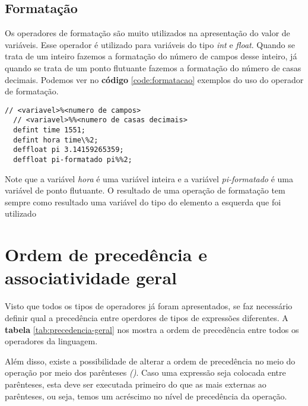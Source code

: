 \documentclass[
  12pt,				%
  oneside,			%
  a4paper,			%
  english,			%
  french,				%
  spanish,			%
  brazil,				%
]{abntex2}
\begin{document}
\subsection{Formatação}
\label{subsec:formatacao}
Os operadores de formatação são muito utilizados na apresentação do
valor de variáveis. Esse operador é utilizado para variáveis do tipo
\emph{int} e \emph{float}. Quando se trata de um inteiro fazemos a
formatação do número de campos desse inteiro, já quando se trata de um
ponto flutuante fazemos a formatação do número de casas
decimais. Podemos ver no \textbf{código} \ref{code:formatacao}
exemplos do uso do operador de formatação.

\begin{lstlisting}[label=code:formatacao,caption=Exemplo do uso do
  operador de formatação]
  // <variavel>%<numero de campos>
  // <variavel>%%<numero de casas decimais>
  defint time 1551;
  defint hora time\%2;
  deffloat pi 3.14159265359;
  deffloat pi-formatado pi%%2;
\end{lstlisting}

Note que a variável \emph{hora} é uma variável inteira e a variável
\emph{pi-formatado} é uma variável de ponto flutuante. O resultado de uma
operação de formatação tem sempre como resultado uma variável do tipo
do elemento a esquerda que foi utilizado



\section{Ordem de precedência e associatividade geral}
\label{sec:order-de-precedencia-e-associatividade-geral}

Visto que todos os tipos de operadores já foram apresentados, se faz
necessário definir qual a precedência entre operdores de tipos de
expressões diferentes. A \textbf{tabela} \ref{tab:precedencia-geral}
nos mostra a ordem de precedência entre todos os operadores da
linguagem.

Além disso, existe a possibilidade de alterar a ordem de precedência
no meio do operação por meio dos parênteses \emph{()}. Caso uma
expressão seja colocada entre parênteses, esta deve ser executada
primeiro do que as mais externas ao parênteses, ou seja, temos um
acréscimo no nível de precedência da operação.
\end{document}
